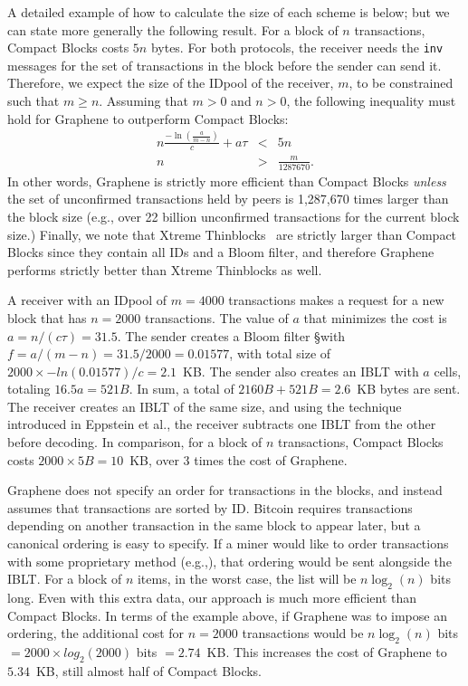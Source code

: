 A detailed example of how to calculate the size of each scheme is below; but we can state more generally the following result. For a
block of $n$ transactions, Compact Blocks costs $5n$ bytes. For both
protocols, the receiver needs the {\tt inv} messages for the set of
transactions in the block before the sender can send it. Therefore, we
expect the size of the IDpool of the receiver, $m$, to be constrained
such that $m \geq n$. Assuming that $m > 0$ and $n > 0$, the following
inequality must hold for Graphene to outperform Compact Blocks: 
\begin{eqnarray}
n\frac{-\ln(\frac{a}{m-n})}{c}+ a\tau &<& 5n\\
n&>& \frac{m}{1287670}.
\end{eqnarray}
In other words, Graphene is strictly more efficient than Compact Blocks {\em unless} the  set of unconfirmed transactions held by peers  is 1,287,670 times larger than the block size (e.g.,  over 22 billion unconfirmed transactions for the current block size.)  Finally, we note that Xtreme Thinblocks~\cite{Tschipper:2016} are  strictly larger than Compact Blocks since they contain all IDs and a Bloom filter, and therefore Graphene performs strictly better than Xtreme Thinblocks as well. 

 A receiver with an IDpool of $m=4000$ transactions
makes a request for a new block that has $n=2000$ transactions. The
value of $a$ that minimizes the cost is $a=n/(c\tau)=31.5$. The sender
creates a Bloom filter \S with $f=a/(m-n)=31.5/2000= 0.01577$,
with total size of $2000\times -ln(0.01577)/c=2.1$~KB.  The
sender also creates an IBLT with $a$ cells, totaling $16.5a=521B$. In
sum, a total of $2160B+521B=2.6$~KB bytes are sent.  The receiver
creates an IBLT of the same size, and using the technique introduced
in Eppstein et al.\cite{eppstein:2011}, the receiver subtracts one
IBLT from the other before decoding. In comparison, for a block of $n$ transactions, Compact Blocks costs $2000\times5B = 10$~KB, over 3 times the cost of Graphene. 

 Graphene does not specify an order for transactions
in the blocks, and instead assumes that transactions are sorted by
ID. Bitcoin requires transactions depending on another transaction in
the same block to appear later, but a canonical ordering is easy to
specify. If a miner would like to order transactions with some
proprietary method (e.g.,\cite{Hanke:2016}), that ordering would be
sent alongside the IBLT. For a block of $n$ items, in the worst case,
the list will be $n\log_2(n)$ bits long.  Even with this extra data, our approach is much more efficient than Compact Blocks.   In terms of the example above, if Graphene was to impose an ordering, the additional cost for $n=2000$ transactions would be $n \log_2(n)$ bits $= 2000\times log_2(2000)$ bits $= 2.74$~KB. This increases the cost of Graphene to $5.34$~KB, still almost half of Compact Blocks.

